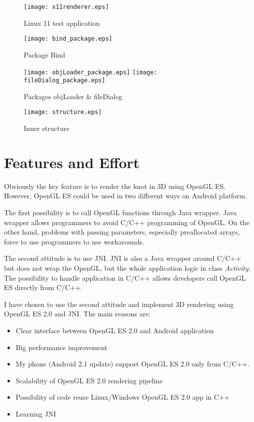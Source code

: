 \begin{figure}
\begin{center}
\texttt{[image: x11renderer.eps]}
\label{pic:x11renderer.eps}
\caption{Linux 11 test application}
\end{center}
\end{figure}

\begin{figure}
\begin{center}
\texttt{[image: bind\_package.eps]}
\label{pic:bind_package.eps}
\caption{Package Bind}
\end{center}
\end{figure}

\begin{figure}
\begin{center}
\texttt{[image: objLoader\_package.eps]}
\texttt{[image: fileDialog\_package.eps]}
\label{pic:objLoader_package.eps}
\caption{Packages objLoader \& fileDialog}
\end{center}
\end{figure}

\begin{figure}
\begin{center}
\texttt{[image: structure.eps]}
\label{pic:structure}
\caption{Inner structure}
\end{center}
\end{figure}

\section*{Features and Effort} %
\label{sec:Features and Effort}
Obviously the key feature is to render the knot in 3D using OpenGL ES.
However, OpenGL ES could be used in two different ways on Android platform.

The first possibility is to call OpenGL functions through Java wrapper.
Java wrapper allows programmers to avoid C/C++ programming of OpenGL.
On the other hand, problems with passing parameters, especially preallocated arrays,
force to use programmers to use workarounds.

The second attitude is to use JNI. JNI is also a Java wrapper around C/C++ but does not wrap the OpenGL,
but the whole application logic in class {\it Activity}. 
The possibility to handle application in C/C++ allows developers call OpenGL ES directly from C/C++.

I have chosen to use the second attitude and implement 3D rendering using OpenGL ES 2.0 and JNI.
The main reasons are:
\begin{itemize}
  \item Clear interface between OpenGL ES 2.0 and Android application
  \item Big performance improvement
  \item My phone (Android 2.1 update) support OpenGL ES 2.0 only from C/C++.
  \item Scalability of OpenGL ES 2.0 rendering pipeline 
  \item Possibility of code reuse Linux/Windows OpenGL ES 2.0 app in C++
  \item Learning JNI
\end{itemize}

